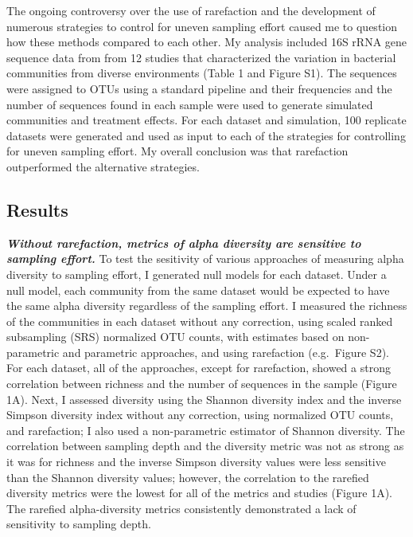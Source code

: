 \documentclass[
]{article}
\begin{document}
The ongoing controversy over the use of rarefaction and the development
of numerous strategies to control for uneven sampling effort caused me
to question how these methods compared to each other. My analysis
included 16S rRNA gene sequence data from from 12 studies that
characterized the variation in bacterial communities from diverse
environments (Table 1 and Figure S1). The sequences were assigned to
OTUs using a standard pipeline and their frequencies and the number of
sequences found in each sample were used to generate simulated
communities and treatment effects. For each dataset and simulation, 100
replicate datasets were generated and used as input to each of the
strategies for controlling for uneven sampling effort. My overall
conclusion was that rarefaction outperformed the alternative strategies.

\hypertarget{results}{%
\subsection{Results}\label{results}}

\textbf{\emph{Without rarefaction, metrics of alpha diversity are
sensitive to sampling effort.}} To test the sesitivity of various
approaches of measuring alpha diversity to sampling effort, I generated
null models for each dataset. Under a null model, each community from
the same dataset would be expected to have the same alpha diversity
regardless of the sampling effort. I measured the richness of the
communities in each dataset without any correction, using scaled ranked
subsampling (SRS) normalized OTU counts, with estimates based on
non-parametric and parametric approaches, and using rarefaction
(e.g.~Figure S2). For each dataset, all of the approaches, except for
rarefaction, showed a strong correlation between richness and the number
of sequences in the sample (Figure 1A). Next, I assessed diversity using
the Shannon diversity index and the inverse Simpson diversity index
without any correction, using normalized OTU counts, and rarefaction; I
also used a non-parametric estimator of Shannon diversity. The
correlation between sampling depth and the diversity metric was not as
strong as it was for richness and the inverse Simpson diversity values
were less sensitive than the Shannon diversity values; however, the
correlation to the rarefied diversity metrics were the lowest for all of
the metrics and studies (Figure 1A). The rarefied alpha-diversity
metrics consistently demonstrated a lack of sensitivity to sampling
depth.
\end{document}
